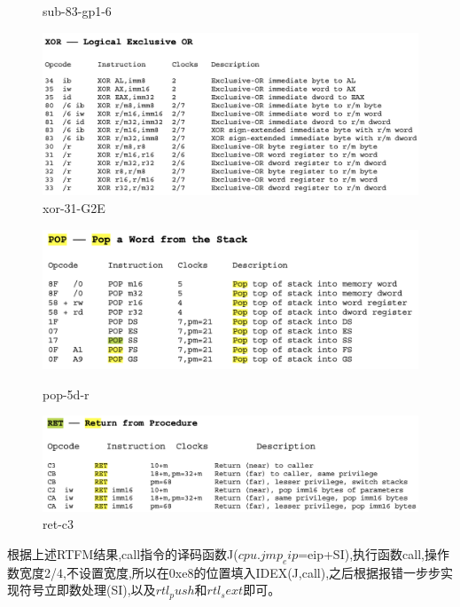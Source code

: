 \documentclass[UTF8,a4paper,10pt]{ctexart}
\begin{document}
{\begin{figure}[!h]
\begin{minipage}[h]{0.5\linewidth}
        \caption{sub-83-gp1-6}
        \end{minipage}%
        \hfill
        \begin{minipage}[h]{0.5\linewidth}
        \centering
        \includegraphics[scale=0.35]{fig/5.png}
        \caption{xor-31-G2E}
        \end{minipage}
    \end{figure}
    \begin{figure}[!h]
        \begin{minipage}[h]{0.5\linewidth}
        \centering
        \includegraphics[scale=0.35]{fig/6.png}
        \caption{pop-5d-r}
        \end{minipage}%
        \hfill
        \begin{minipage}[h]{0.5\linewidth}
        \centering
        \includegraphics[scale=0.35]{fig/7.png}
        \caption{ret-c3}
        \end{minipage}
    \end{figure}
    根据上述RTFM结果,call指令的译码函数J($cpu.jmp_eip$=eip+SI),执行函数call,操作数宽度2/4,不设置宽度,所以在0xe8的位置填入IDEX(J,call),之后根据报错一步步实现符号立即数处理(SI),以及$rtl_push$和$rtl_sext$即可。
}
\end{document}
